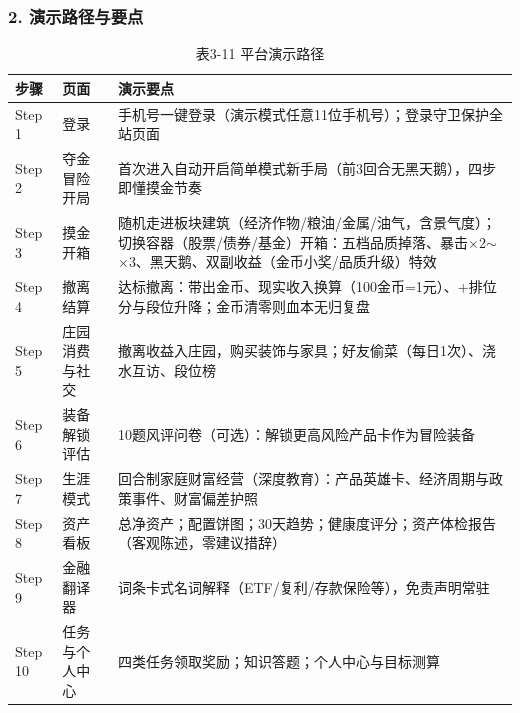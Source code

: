 \documentclass[12pt,a4paper]{ctexart}
\newcommand{\sub}[1]{\subsubsection*{#1}}
\begin{document}
\sub{2. 演示路径与要点}
\begin{table}[htbp]
\centering
\begin{tabular}{p{1.6cm}p{3.6cm}p{7.4cm}}
\toprule
\textbf{步骤} & \textbf{页面} & \textbf{演示要点} \\
\midrule
Step 1 & 登录 & 手机号一键登录（演示模式任意11位手机号）；登录守卫保护全站页面 \\
Step 2 & 夺金冒险开局 & 首次进入自动开启简单模式新手局（前3回合无黑天鹅），四步即懂摸金节奏 \\
Step 3 & 摸金开箱 & 随机走进板块建筑（经济作物/粮油/金属/油气，含景气度）；切换容器（股票/债券/基金）开箱：五档品质掉落、暴击$\times$2$\sim$$\times$3、黑天鹅、双副收益（金币小奖/品质升级）特效 \\
Step 4 & 撤离结算 & 达标撤离：带出金币、现实收入换算（100金币=1元）、+排位分与段位升降；金币清零则血本无归复盘 \\
Step 5 & 庄园消费与社交 & 撤离收益入庄园，购买装饰与家具；好友偷菜（每日1次）、浇水互访、段位榜 \\
Step 6 & 装备解锁评估 & 10题风评问卷（可选）：解锁更高风险产品卡作为冒险装备 \\
Step 7 & 生涯模式 & 回合制家庭财富经营（深度教育）：产品英雄卡、经济周期与政策事件、财富偏差护照 \\
Step 8 & 资产看板 & 总净资产；配置饼图；30天趋势；健康度评分；资产体检报告（客观陈述，零建议措辞） \\
Step 9 & 金融翻译器 & 词条卡式名词解释（ETF/复利/存款保险等），免责声明常驻 \\
Step 10 & 任务与个人中心 & 四类任务领取奖励；知识答题；个人中心与目标测算 \\
\bottomrule
\end{tabular}
\caption*{表3-11 \quad 平台演示路径}
\end{table}
\end{document}
